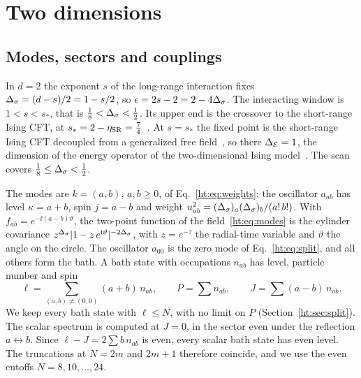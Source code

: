\section{Two dimensions}\label{ht:d2:sec}

\subsection{Modes, sectors and couplings}\label{ht:d2:modes}
In $d=2$ the exponent $s$ of the long-range interaction fixes $\Delta_\sigma=(d-s)/2=1-s/2$, so $\epsilon=2s-2=2-4\Delta_\sigma$. The
interacting window is $1<s<s_*$, that is $\frac18<\Delta_\sigma<\frac12$. Its upper end is the crossover to the short-range Ising
CFT, at $s_*=2-\eta_{\rm SR}=\frac74$~\cite{ht:Sak:1973oqx,ht:Behan:2017dwr,ht:Behan:2017emf}. At $s=s_*$ the fixed point is the
short-range Ising CFT decoupled from a generalized free field~\cite{ht:Behan:2017dwr,ht:Behan:2017emf}, so there $\Delta_{\mathcal E}=1$, the
dimension of the energy operator of the two-dimensional Ising model~\cite{ht:Belavin:1984vu}. The scan covers
$\frac18\le\Delta_\sigma<\frac12$.

The modes are $k=(a,b)$, $a,b\ge0$, of Eq.~\eqref{ht:eq:weights}: the oscillator $a_{ab}$ has level $\kappa=a+b$, spin
$j=a-b$ and weight $u_{ab}^2=(\Delta_\sigma)_a(\Delta_\sigma)_b/(a!\,b!)$. With $f_{ab}=e^{-\ii(a-b)\vartheta}$, the two-point function of
the field~\eqref{ht:eq:modes} is the cylinder covariance $z^{\Delta_\sigma}|1-z\,e^{\mathrm i\vartheta}|^{-2\Delta_\sigma}$, with $z=e^{-\tau}$ the
radial-time variable and $\vartheta$ the angle on the circle. The oscillator $a_{00}$ is the zero mode of
Eq.~\eqref{ht:eq:split}, and all others form the bath. A bath state with occupations $n_{ab}$ has level, particle number
and spin
\begin{equation}
 \ell=\sum_{(a,b)\neq(0,0)}(a+b)\,n_{ab},\qquad P=\sum n_{ab},\qquad J=\sum(a-b)\,n_{ab}.
\end{equation}
We keep every bath state with $\ell\le N$, with no limit on $P$ (Section~\ref{ht:sec:split}). The scalar spectrum is
computed at $J=0$, in the sector even under the reflection $a\leftrightarrow b$. Since $\ell-J=2\sum b\,n_{ab}$ is
even, every scalar bath state has even level. The truncations at $N=2m$ and $2m+1$ therefore coincide, and we use the
even cutoffs $N=8,10,\dots,24$.

